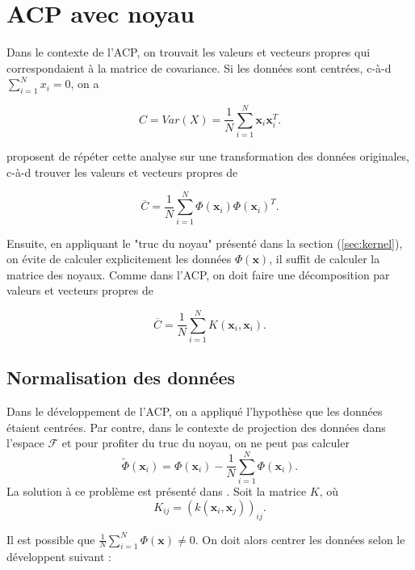 \section{ACP avec noyau}

Dans le contexte de l'ACP, on trouvait les valeurs et vecteurs propres qui correspondaient à la matrice de covariance. Si les données sont centrées, c-à-d $\sum_{i = 1}^{N}x_i = 0$, on a 

\begin{equation*}
C = Var(X) = \frac{1}{N} \sum_{i = 1}^N \textbf{x}_i \textbf{x}_i^T.
\end{equation*}

\cite{scholkopf1997kernel} proposent de répéter cette analyse sur une transformation des données originales, c-à-d trouver les valeurs et vecteurs propres de

\begin{equation}\label{eq:covkernel}
\overline{C} = \frac{1}{N} \sum_{i = 1}^{N} \Phi(\textbf{x}_i)\Phi(\textbf{x}_i)^T.
\end{equation}

Ensuite, en appliquant le "truc du noyau" présenté dans la section (\ref{sec:kernel}), on évite de calculer explicitement les données $\Phi(\textbf{x})$, il suffit de calculer la matrice des noyaux. Comme dans l'ACP, on doit faire une décomposition par valeurs et vecteurs propres de 

\begin{equation}\label{eq:covkernel}
\overline{C} = \frac{1}{N} \sum_{i = 1}^{N} K(\textbf{x}_i, \textbf{x}_i).
\end{equation}

\subsection{Normalisation des données}

Dans le développement de l'ACP, on a appliqué l'hypothèse que les données étaient centrées. Par contre, dans le contexte de projection des données dans l'espace $\mathcal{F}$ et pour profiter du truc du noyau, on ne peut pas calculer $$\tilde{\Phi}(\textbf{x}_i) = \Phi(\textbf{x}_i) - \frac{1}{N}\sum_{i = 1}^{N}\Phi(\textbf{x}_i).$$ La solution à ce problème est présenté dans \cite{scholkopf1998nonlinear}. Soit la matrice $K$, où 
$$K_{ij} = (k(\textbf{x}_i, \textbf{x}_j))_{ij}.$$

Il est possible que $\frac{1}{N} \sum_{i = 1}^{N} \Phi(\textbf{x}) \neq 0$. On doit alors centrer les données selon le développent suivant : 

